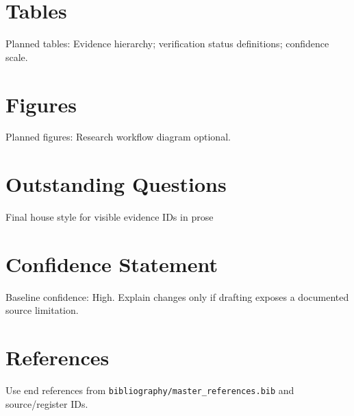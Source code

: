 \section{Tables}
Planned tables: Evidence hierarchy; verification status definitions; confidence scale.

\section{Figures}
Planned figures: Research workflow diagram optional.

\section{Outstanding Questions}
Final house style for visible evidence IDs in prose

\section{Confidence Statement}
Baseline confidence: High. Explain changes only if drafting exposes a documented source limitation.

\section{References}
Use end references from \texttt{bibliography/master_references.bib} and source/register IDs.
